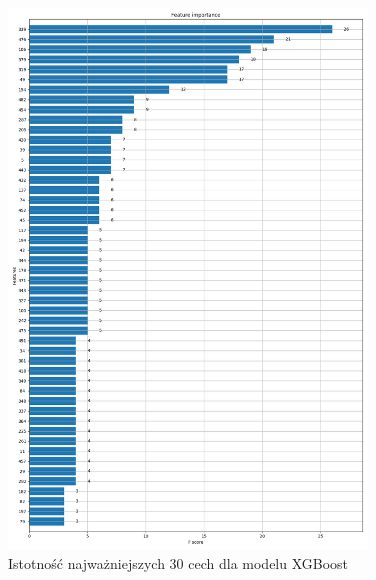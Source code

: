\documentclass[a4paper,12pt]{article}
\begin{document}
\begin{appendices}
        \begin{figure}[!h]
            \centering
            \includegraphics[width=0.85\textwidth]{../images/xgboost-feature-importance.png}
            \caption{Istotność najważniejszych 30 cech dla modelu XGBoost}
            \label{fig:feature-importance-xgboost}
        \end{figure}

    \end{appendices}
\end{document}
